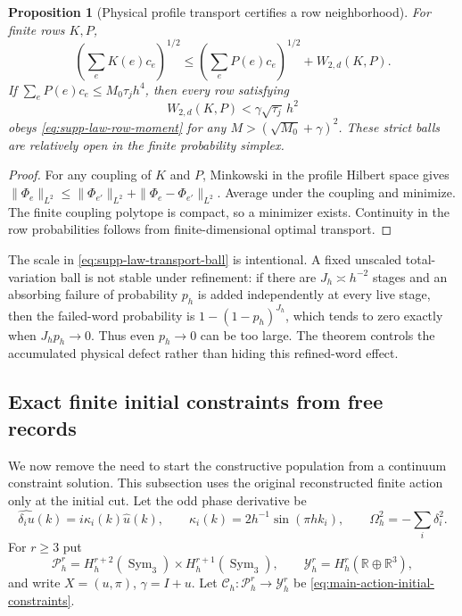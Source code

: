 \documentclass[11pt]{article}
\newtheorem{proposition}[proposition]{Proposition}
\theoremstyle{definition}
\theoremstyle{remark}
\begin{document}
\begin{proposition}[Physical profile transport certifies a row neighborhood]
\label{prop:supp-law-transport}
For finite rows $K,P$,
\begin{equation}
 \left(\sum_eK(e)c_e\right)^{1/2}
 \le\left(\sum_eP(e)c_e\right)^{1/2}+W_{2,d}(K,P).
 \label{eq:supp-law-transport-bound}
\end{equation}
If $\sum_eP(e)c_e\le M_0\tau_jh^4$, then every row satisfying
\begin{equation}
 W_{2,d}(K,P)<\gamma\sqrt{\tau_j}\,h^2
 \label{eq:supp-law-transport-ball}
\end{equation}
obeys \eqref{eq:supp-law-row-moment} for any
$M>(\sqrt{M_0}+\gamma)^2$.  These strict balls are relatively open in the
finite probability simplex.
\end{proposition}
\begin{proof}
For any coupling of $K$ and $P$, Minkowski in the profile Hilbert space gives
$\|\Phi_e\|_{L^2}\le\|\Phi_{e'}\|_{L^2}+\|\Phi_e-\Phi_{e'}\|_{L^2}$.
Average under the coupling and minimize.  The finite coupling polytope is
compact, so a minimizer exists.  Continuity in the row probabilities follows
from finite-dimensional optimal transport.
\end{proof}

The scale in \eqref{eq:supp-law-transport-ball} is intentional.  A fixed
unscaled total-variation ball is not stable under refinement: if there are
$J_h\asymp h^{-2}$ stages and an absorbing failure of probability $p_h$ is
added independently at every live stage, then the failed-word probability is
$1-(1-p_h)^{J_h}$, which tends to zero exactly when $J_hp_h\to0$.  Thus even
$p_h\to0$ can be too large.  The theorem controls the accumulated physical
defect rather than hiding this refined-word effect.

\subsection{Exact finite initial constraints from free records}

We now remove the need to start the constructive population from a continuum
constraint solution.  This subsection uses the original reconstructed finite
action only at the initial cut.  Let the odd phase derivative be
\begin{equation}
 \widehat{\delta_i u}(k)=i\kappa_i(k)\widehat u(k),
 \qquad \kappa_i(k)=2h^{-1}\sin(\pi hk_i),
 \qquad \Omega_h^2=-\sum_i\delta_i^2.
 \label{eq:supp-initial-phase-derivative}
\end{equation}
For $r\ge3$ put
\begin{equation}
 \mathcal P_h^r=H_h^{r+2}(\operatorname{Sym}_3)
                 \times H_h^{r+1}(\operatorname{Sym}_3),
 \qquad \mathcal Y_h^r=H_h^r(\mathbb R\oplus\mathbb R^3),
 \label{eq:supp-initial-spaces}
\end{equation}
and write $X=(u,\pi)$, $\gamma=I+u$.  Let
$\mathscr C_h:\mathcal P_h^r\to\mathcal Y_h^r$ be
\eqref{eq:main-action-initial-constraints}.
\end{document}
